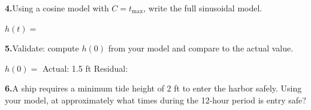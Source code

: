 \documentclass[10pt]{article}
\begin{document}
\begin{tcolorbox}[colback=white, colframe=black!40,
    title=\textbf{Tier A --- Apply},
    fonttitle=\bfseries, arc=2mm, left=3mm, right=3mm, top=2mm, bottom=2mm]
\vspace{6pt}
\textbf{4.}\quad Using a cosine model with $C = t_{\max}$, write the full sinusoidal model.

$h(t) = $ \underline{\hspace{8cm}}

\vspace{6pt}
\textbf{5.}\quad Validate: compute $h(0)$ from your model and compare to the actual value.

$h(0) = $ \underline{\hspace{3cm}} \quad Actual: 1.5 ft \quad Residual: \underline{\hspace{2cm}}

\vspace{6pt}
\textbf{6.}\quad A ship requires a minimum tide height of 2 ft to enter the harbor safely.
Using your model, at approximately what times during the 12-hour period is entry safe?

\end{tcolorbox}

\vspace{0.08in}
\end{document}

